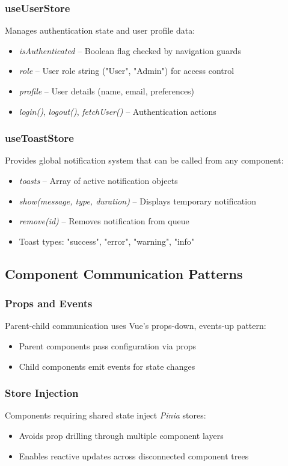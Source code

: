 \subsubsection*{useUserStore}
Manages authentication state and user profile data:
\begin{itemize}
    \item \textit{isAuthenticated} – Boolean flag checked by navigation guards
    \item \textit{role} – User role string ("User", "Admin") for access control
    \item \textit{profile} – User details (name, email, preferences)
    \item \textit{login()}, \textit{logout()}, \textit{fetchUser()} – Authentication actions
\end{itemize}

\subsubsection*{useToastStore}
Provides global notification system that can be called from any component:
\begin{itemize}
    \item \textit{toasts} – Array of active notification objects
    \item \textit{show(message, type, duration)} – Displays temporary notification
    \item \textit{remove(id)} – Removes notification from queue
    \item Toast types: "success", "error", "warning", "info"
\end{itemize}

\subsection{Component Communication Patterns}
\subsubsection*{Props and Events}
Parent-child communication uses Vue's props-down, events-up pattern:
\begin{itemize}
    \item Parent components pass configuration via props
    \item Child components emit events for state changes
\end{itemize}

\subsubsection*{Store Injection}
Components requiring shared state inject \textit{Pinia} stores:
\begin{itemize}
    \item Avoids prop drilling through multiple component layers
    \item Enables reactive updates across disconnected component trees
\end{itemize}

